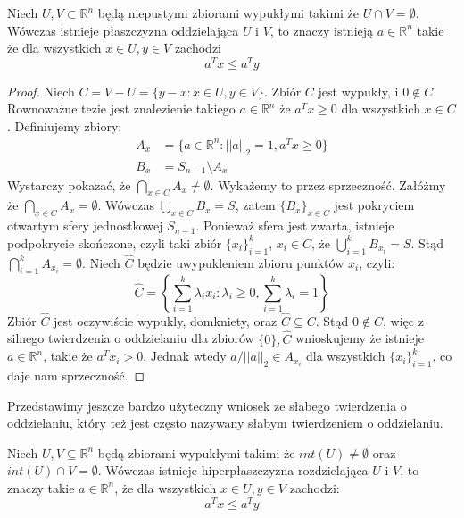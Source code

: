 \documentclass[10pt,a4paper,draft]{report}
\begin{document}
\begin{theorem}
Niech $U,V \subset \mathbb{R}^n$ będą niepustymi zbiorami  wypukłymi takimi że $U \cap V = \emptyset$. Wówczas istnieje płaszczyzna oddzielająca $U$ i $V$, to znaczy istnieją $a \in \mathbb{R}^n$ takie że dla wszystkich $x \in U, y \in V$ zachodzi
\[
a^T x \leq a^T y
\]
\end{theorem}
\begin{proof}
Niech $C = V - U = \{ y - x: x \in U, y \in V \}$. Zbiór $C$ jest wypukły, i $0 \not\in C$. Rownoważne tezie jest znalezienie takiego $a \in \mathbb{R}^n$ że $a^T x \geq 0$ dla wszystkich $x \in C$. Definiujemy zbiory:
\[
\begin{aligned}
A_x &= \{a \in \mathbb{R}^n : ||a||_2 = 1 , a^T x \geq 0 \} \\
B_x &= S_{n-1} \setminus A_x 
\end{aligned}
\]
Wystarczy pokazać, że $\bigcap_{x \in C} A_x \neq \emptyset$. Wykażemy to przez sprzeczność. Załóżmy że $\bigcap_{x \in C} A_x = \emptyset$. Wówczas $\bigcup_{x \in C} B_x = S$, zatem $\{B_x\}_{x \in C}$ jest pokryciem otwartym sfery jednostkowej $S_{n-1}$. Ponieważ sfera jest zwarta, istnieje podpokrycie skończone, czyli taki zbiór $\{x_i\}_{i=1}^k$, $x_i \in C$, że $\bigcup_{i=1}^k B_{x_i} = S$. Stąd $\bigcap_{i=1}^k A_{x_i} = \emptyset$. Niech $\hat{C}$ będzie uwypukleniem zbioru punktów $x_i$, czyli:
\[
\hat{C} = \left\{ \sum_{i=1}^k \lambda_i x_i : \lambda_i \geq 0, \sum_{i=1}^k \lambda_i = 1\right\} 
\] 
Zbiór $\hat{C}$ jest oczywiście wypukly, domkniety, oraz $\hat{C} \subseteq C$. Stąd $0 \not\in \hat{C}$, więc z silnego twierdzenia o oddzielaniu dla zbiorów $\{0\}, \hat{C}$ wnioskujemy że istnieje $a \in \mathbb{R}^n$, takie że $a^T x_i > 0$. Jednak wtedy $a / ||a||_2 \in A_{x_i}$ dla wszystkich $\{x_i\}_{i=1}^k$, co daje nam sprzeczność.
\end{proof}

Przedstawimy jeszcze bardzo użyteczny wniosek ze słabego twierdzenia o oddzielaniu, który też jest często nazywany słabym twierdzeniem o oddzielaniu.
\begin{corollary} \label{cor:weak_sep}
Niech $U,V \subseteq \mathbb{R}^n$ będą zbiorami wypukłymi takimi że $int(U) \neq \emptyset$ oraz $int(U) \cap V = \emptyset$. Wówczas istnieje hiperpłaszczyzna rozdzielająca $U$ i $V$, to znaczy takie $a \in \mathbb{R}^n$, że dla wszystkich $x \in U, y \in V$ zachodzi:
\[
a^T x \leq a^T y
\]
\end{corollary}
\end{document}
